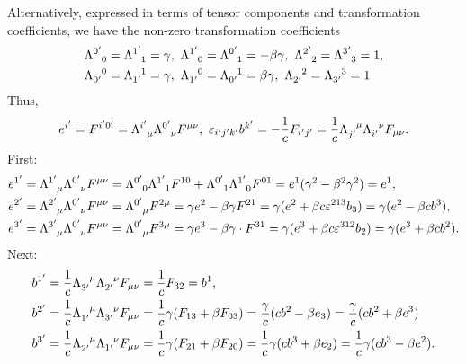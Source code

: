 Alternatively, expressed in terms of tensor components and transformation coefficients, we have the non-zero transformation coefficients
\begin{align*}
	&\trcou{0\p}{0} = \trcou{1\p}{1} = \gamma,\ \trcou{1\p}{0} = \trcou{0\p}{1} = -\beta\gamma,\ \trcou{2\p}{2} = \trcou{3\p}{3} = 1, \\
	&\trcod{0\p}{0} = \trcod{1\p}{1} = \gamma,\ \trcod{1\p}{0} = \trcod{0\p}{1} = \beta\gamma,\ \trcod{2\p}{2} = \trcod{3\p}{3} = 1
\end{align*}
Thus,
\begin{align*}
	e^{i\p} = F^{i\p 0\p} = \trcou{i\p}{\mu}\trcou{0\p}{\nu}F^{\mu\nu},\ \varepsilon_{i\p j\p k\p}b^{k\p} = -\frac{1}{c}F_{i\p j\p} = \frac{1}{c}\trcod{j\p}{\mu}\trcod{i\p}{\nu}F_{\mu\nu}.
\end{align*}
First:
\begin{align*}
	e^{1\p} &= \trcou{1\p}{\mu}\trcou{0\p}{\nu}F^{\mu\nu} = \trcou{0\p}{0}\trcou{1\p}{1}F^{10} + \trcou{0\p}{1}\trcou{1\p}{0}F^{01} = e^{1}(\gamma^{2} - \beta^{2}\gamma^{2}) = e^{1}, \\
	e^{2\p} &= \trcou{2\p}{\mu}\trcou{0\p}{\nu}F^{\mu\nu} = \trcou{0\p}{\mu}F^{2\mu} = \gamma e^{2} - \beta\gamma F^{21} = \gamma(e^{2} + \beta c\varepsilon^{213}b_{3}) = \gamma(e^{2} - \beta cb^{3}), \\
	e^{3\p} &= \trcou{3\p}{\mu}\trcou{0\p}{\nu}F^{\mu\nu} = \trcou{0\p}{\mu}F^{3\mu} = \gamma e^{3} - \beta\gamma\cdot F^{31} = \gamma(e^{3} + \beta c\varepsilon^{312}b_{2}) = \gamma(e^{3} + \beta cb^{2}).
\end{align*}
Next:
\begin{align*}
	b^{1\p} &= \frac{1}{c}\trcod{3\p}{\mu}\trcod{2\p}{\nu}F_{\mu\nu} = \frac{1}{c}F_{32} = b^{1}, \\
	b^{2\p} &= \frac{1}{c}\trcod{1\p}{\mu}\trcod{3\p}{\nu}F_{\mu\nu} = \frac{1}{c}\gamma(F_{13} + \beta F_{03}) = \frac{\gamma}{c}(cb^{2} - \beta e_{3}) = \frac{\gamma}{c}(cb^{2} + \beta e^{3}) \\
	b^{3\p} &= \frac{1}{c}\trcod{2\p}{\mu}\trcod{1\p}{\nu}F_{\mu\nu} = \frac{1}{c}\gamma(F_{21} + \beta F_{20}) = \frac{1}{c}\gamma(cb^{3} + \beta e_{2}) = \frac{1}{c}\gamma(cb^{3} - \beta e^{2}).
\end{align*}

